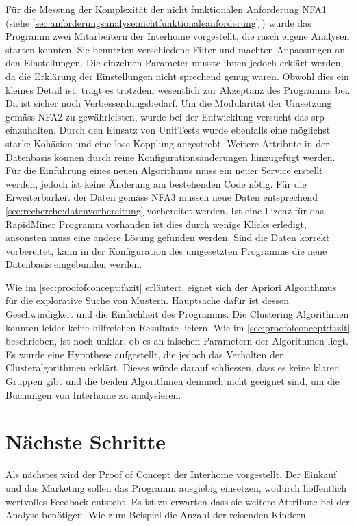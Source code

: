 Für die Messung der Komplexität der nicht funktionalen Anforderung NFA1 (siehe \cref{sec:anforderungsanalyse:nichtfunktionaleanforderung} ) wurde das Programm zwei Mitarbeitern der Interhome vorgestellt, die rasch eigene Analysen starten konnten. Sie benutzten verschiedene Filter und machten Anpassungen an den Einstellungen. Die einzelnen Parameter musste ihnen jedoch erklärt werden, da die Erklärung der Einstellungen nicht sprechend genug waren. Obwohl dies ein kleines Detail ist, trägt es trotzdem wesentlich zur Akzeptanz des Programms bei. Da ist sicher noch Verbesserdungsbedarf. Um die Modularität der Umsetzung gemäss NFA2 zu gewährleisten, wurde bei der Entwicklung versucht das \gls{srp} einzuhalten. Durch den Einsatz von UnitTests wurde ebenfalls eine möglichst starke Kohäsion und eine lose Kopplung angestrebt. Weitere Attribute in der Datenbasis können durch reine Konfigurationsänderungen hinzugefügt werden. Für die Einführung eines neuen Algorithmus muss ein neuer Service erstellt werden, jedoch ist keine Änderung am bestehenden Code nötig. Für die Erweiterbarkeit der Daten gemäss NFA3 müssen neue Daten entsprechend \cref{sec:recherche:datenvorbereitung}  vorbereitet werden. Ist eine Lizenz für das RapidMiner Programm vorhanden ist dies durch wenige Klicks erledigt, ansonsten muss eine andere Lösung gefunden werden. Sind die Daten korrekt vorbereitet, kann in der Konfiguration des umgesetzten Programms die neue Datenbasis eingebunden werden. 

Wie im \cref{sec:proofofconcept:fazit}  erläutert, eignet sich der Apriori Algorithmus für die explorative Suche von Mustern. Hauptsache dafür ist dessen Geschwindigkeit und die Einfachheit des Programms. Die Clustering Algorithmen konnten leider keine hilfreichen Resultate liefern. Wie im \cref{sec:proofofconcept:fazit}  beschrieben, ist noch unklar, ob es an falschen Parametern der Algorithmen liegt. Es wurde eine Hypothese aufgestellt, die jedoch das Verhalten der Clusteralgorithmen erklärt. Dieses würde darauf schliessen, dass es keine klaren Gruppen gibt und die beiden Algorithmen demnach nicht geeignet sind, um die Buchungen von Interhome zu analysieren.


\section{Nächste Schritte}
Als nächstes wird der Proof of Concept der Interhome vorgestellt. Der Einkauf und das Marketing sollen das Programm ausgiebig einsetzen, wodurch hoffentlich wertvolles Feedback entsteht. Es ist zu erwarten dass sie weitere Attribute bei der Analyse benötigen. Wie zum Beispiel die Anzahl der reisenden Kindern.

